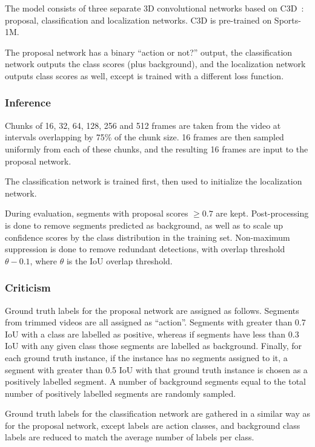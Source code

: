 \documentclass[a4paper, 12pt]{article}
\begin{document}
The model consists of three separate 3D convolutional networks based
on C3D~\cite{DBLP:journals/corr/TranBFTP14}: proposal, classification and
localization networks. C3D is pre-trained on Sports-1M.

The proposal network has a binary ``action or not?'' output, the classification
network outputs the class scores (plus background), and the localization
network outputs class scores as well, except is trained with a different loss
function.

\subsubsection{Inference}

Chunks of 16, 32, 64, 128, 256 and 512 frames are taken from the video at
intervals overlapping by 75\% of the chunk size. 16 frames are then sampled
uniformly from each of these chunks, and the resulting 16 frames are input to
the proposal network.

The classification network is trained first, then used to initialize the
localization network.

During evaluation, segments with proposal scores $\geq 0.7$ are kept.
Post-processing is done to remove segments predicted as background, as well as
to scale up confidence scores by the class distribution in the training set.
Non-maximum suppression is done to remove redundant detections, with overlap
threshold $\theta - 0.1$, where $\theta$ is the IoU overlap threshold.

\subsubsection{Criticism}

Ground truth labels for the proposal network are assigned as follows. Segments
from trimmed videos are all assigned as ``action''. Segments with greater than
0.7 IoU with a class are labelled as positive, whereas if segments have less
than 0.3 IoU with any given class those segments are labelled as background.
Finally, for each ground truth instance, if the instance has no segments
assigned to it, a segment with greater than 0.5 IoU with that ground truth
instance is chosen as a positively labelled segment. A number of background
segments equal to the total number of positively labelled segments are randomly
sampled.

Ground truth labels for the classification network are gathered in a similar
way as for the proposal network, except labels are action classes, and
background class labels are reduced to match the average number of labels per
class.
\end{document}
